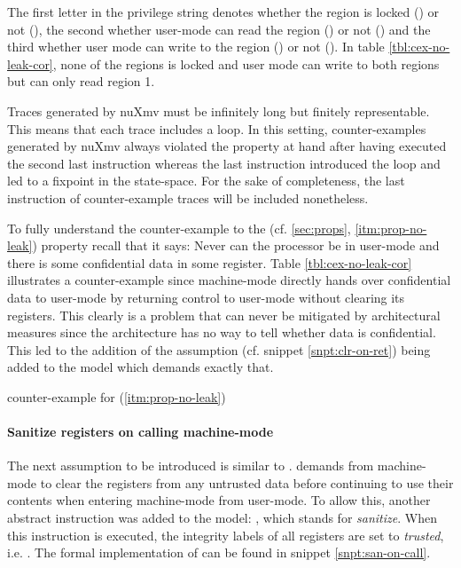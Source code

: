 The first letter in the privilege string denotes whether the region is locked () or not (\minrv{-}), the second whether user-mode can read the region () or not (\minrv{-}) and the third whether user mode can write to the region () or not (\minrv{-}).
In table \ref{tbl:cex-no-leak-cor}, none of the regions is locked and user mode can write to both regions but can only read region 1.

Traces generated by nuXmv must be infinitely long but finitely representable.
This means that each trace includes a loop.
In this setting, counter-examples generated by nuXmv always violated the property at hand after having executed the second last instruction whereas the last instruction introduced the loop and led to a fixpoint in the state-space.
For the sake of completeness, the last instruction of counter-example traces will be included nonetheless.

To fully understand the counter-example to the  (cf. \ref{sec:props}, \ref{itm:prop-no-leak}) property recall that it says: Never can the processor be in user-mode and there is some confidential data in some register.
Table \ref{tbl:cex-no-leak-cor} illustrates a counter-example since machine-mode directly hands over confidential data to user-mode by returning control to user-mode without clearing its registers.
This clearly is a problem that can never be mitigated by architectural measures since the architecture has no way to tell whether data is confidential.
This led to the addition of the assumption  (cf. snippet \ref{snpt:clr-on-ret}) being added to the model which demands exactly that.

\begin{table}
    \centering
    
    \caption{ counter-example for  (\ref{itm:prop-no-leak})}
    \label{tbl:cex-no-leak-cor}
\end{table}

\paragraph{Sanitize registers on calling machine-mode}
The next assumption to be introduced is similar to .
 demands from machine-mode to clear the registers from any untrusted data before continuing to use their contents when entering machine-mode from user-mode.
To allow this, another abstract instruction was added to the model: , which stands for \textit{sanitize}.
When this instruction is executed, the integrity labels of all registers are set to \textit{trusted}, i.e. .
The formal implementation of  can be found in snippet \ref{snpt:san-on-call}.


